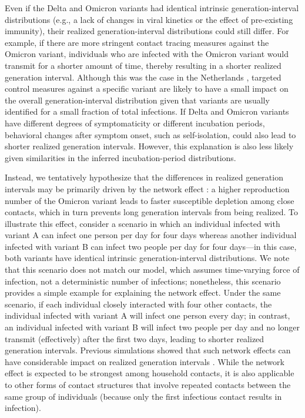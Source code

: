 \documentclass[12pt]{article}
\begin{document}
Even if the Delta and Omicron variants had identical intrinsic generation-interval distributions (e.g., a lack of changes in viral kinetics or the effect of pre-existing immunity), their realized generation-interval distributions could still differ.
For example, if there are more stringent contact tracing measures against the Omicron variant, individuals who are infected with the Omicron variant would transmit for a shorter amount of time, thereby resulting in a shorter realized generation interval.
Although this was the case in the Netherlands \citep{backer2021omicron}, targeted control measures against a specific variant are likely to have a small impact on the overall generation-interval distribution given that variants are usually identified for a small fraction of total infections.
If Delta and Omicron variants have different degrees of symptomaticity or different incubation periods, behavioral changes after symptom onset, such as self-isolation, could also lead to shorter realized generation intervals.
However, this explanation is also less likely given similarities in the inferred incubation-period distributions.

Instead, we tentatively hypothesize that the differences in realized generation intervals may be primarily driven by the network effect \citep{park2020inferring,hart2022generation}: a higher reproduction number of the Omicron variant leads to faster susceptible depletion among close contacts, which in turn prevents long generation intervals from being realized. 
To illustrate this effect, consider a scenario in which an individual infected with variant A can infect one person per day for four days whereas another individual infected with variant B can infect two people per day for four days---in this case, both variants have identical intrinsic generation-interval distributions.
We note that this scenario does not match our model, which assumes time-varying force of infection, not a deterministic number of infections; nonetheless, this scenario provides a simple example for explaining the network effect.
Under the same scenario, if each individual closely interacted with four other contacts, the individual infected with variant A will infect one person every day; in contrast, an individual infected with variant B will infect two people per day and no longer transmit (effectively) after the first two days, leading to shorter realized generation intervals.
Previous simulations showed that such network effects can have considerable impact on realized generation intervals \citep{park2020inferring}.
While the network effect is expected to be strongest among household contacts, it is also applicable to other forms of contact structures that involve repeated contacts between the same group of individuals (because only the first infectious contact results in infection).
\end{document}
